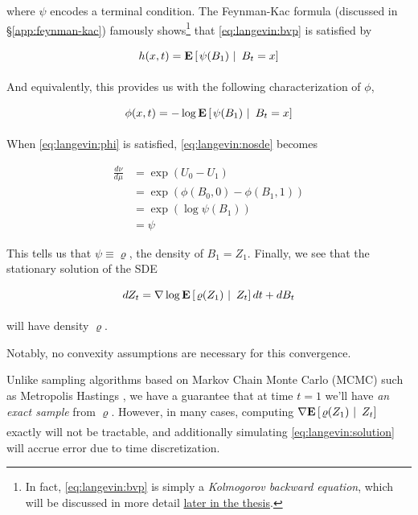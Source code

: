 where $\psi$ encodes a terminal condition. The Feynman-Kac formula
\citep{kac1949distributions} (discussed in \S\ref{app:feynman-kac}) famously
shows\footnote{In fact, \eqref{eq:langevin:bvp} is simply a \emph{Kolmogorov
backward equation}, which will be discussed in more detail
\hyperref[thm:kbe]{later in the thesis}.} that \eqref{eq:langevin:bvp} is
satisfied by

\begin{equation}
  \label{eq:langevin:bvp:solution}
  h(x, t) = \underset{}{\mathbf{E}}\left[\left. \psi(B_1)\ \right\rvert\ B_t = x\right]
\end{equation}

And equivalently, this provides us with the following characterization
of $\phi$,

\begin{equation}
  \label{eq:langevin:phi}
  \phi(x, t) = -\log\underset{}{\mathbf{E}}\left[\left. \psi(B_1)\ \right\rvert\ B_t=x\right]
\end{equation}

When \eqref{eq:langevin:phi} is satisfied, \eqref{eq:langevin:nosde}
becomes

\begin{align*}
  \frac{d\nu}{d\mu} &= \exp(U_0 - U_1)\\
                    &= \exp(\phi(B_0, 0) - \phi(B_1, 1))\\
  &= \exp(\log\psi(B_1))\\
  &= \psi
\end{align*}

This tells us that $\psi\equiv\varrho$, the density of
$B_1=Z_1$. Finally, we see that the stationary solution of the SDE

\begin{equation}
  \label{eq:langevin:solution}
  dZ_t = \nabla\log\underset{}{\mathbf{E}}\left[\left. \varrho(Z_1)\ \right\rvert\ Z_t\right]dt + dB_t
\end{equation}

will have density $\varrho$.

\begin{remark}
  Notably, no convexity assumptions are necessary for this
  convergence.
\end{remark}

\begin{remark}
  Unlike sampling algorithms based on Markov Chain Monte Carlo (MCMC)
  such as Metropolis Hastings \citep{hastings1970monte},
  we have a guarantee that at time $t=1$ we'll have \emph{an exact
    sample} from $\varrho$. However, in many cases, computing
  $\nabla\underset{}{\mathbf{E}}\left[\left. \varrho(Z_1)\ \right\rvert\ Z_t\right]$ exactly will not be
  tractable, and additionally simulating \eqref{eq:langevin:solution}
  will accrue error due to time discretization.
\end{remark}

